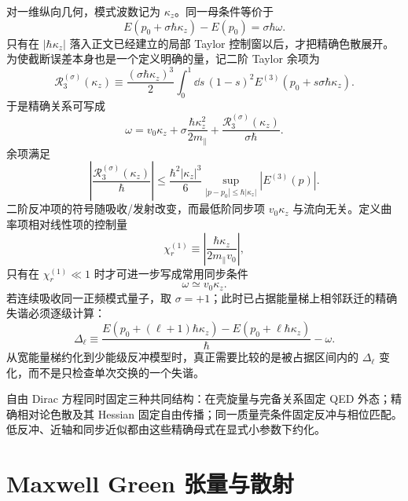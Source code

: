 对一维纵向几何，模式波数记为 $\kappa_z$。同一母条件等价于
\begin{equation}
 \boxed{E(p_0+\sigma\hbar \kappa_z)-E(p_0)=\sigma\hbar\omega.}
 \label{eq:exact-longitudinal-match}
\end{equation}
只有在 $|\hbar\kappa_z|$ 落入正文已经建立的局部 Taylor 控制窗以后，才把精确色散展开。为使截断误差本身也是一个定义明确的量，记二阶 Taylor 余项为
\begin{equation*}
 \mathcal R_3^{(\sigma)}(\kappa_z)
 \equiv
 \frac{(\sigma\hbar\kappa_z)^3}{2}
 \int_0^1\dd s\,(1-s)^2
 E^{(3)}\!\left(p_0+s\sigma\hbar\kappa_z\right).
\end{equation*}
于是精确关系可写成
\begin{equation}
 \boxed{
 \omega
 =v_0\kappa_z+\sigma\frac{\hbar \kappa_z^2}{2m_\parallel}
 +\frac{\mathcal R_3^{(\sigma)}(\kappa_z)}{\sigma\hbar}.}
 \label{eq:recoil-phase-match}
\end{equation}
余项满足
\begin{equation*}
 \left|
 \frac{\mathcal R_3^{(\sigma)}(\kappa_z)}{\hbar}
 \right|
 \le
 \frac{\hbar^2|\kappa_z|^3}{6}
 \sup_{|p-p_0|\le\hbar|\kappa_z|}|E^{(3)}(p)|.
\end{equation*}
二阶反冲项的符号随吸收/发射改变，而最低阶同步项 $v_0\kappa_z$ 与流向无关。定义曲率项相对线性项的控制量
\begin{equation*}
 \chi_r^{(1)}\equiv
 \left|\frac{\hbar \kappa_z}{2m_\parallel v_0}\right|,
\end{equation*}
只有在 $\chi_r^{(1)}\ll1$ 时才可进一步写成常用同步条件
\begin{equation}
 \omega\simeq v_0\kappa_z.
 \label{eq:linear-sync}
\end{equation}
若连续吸收同一正频模式量子，取 $\sigma=+1$；此时已占据能量梯上相邻跃迁的精确失谐必须逐级计算：
\begin{equation}
 \boxed{
 \Delta_\ell\equiv
 \frac{E(p_0+(\ell+1)\hbar \kappa_z)-E(p_0+\ell\hbar \kappa_z)}{\hbar}-\omega.}
 \label{eq:exact-ladder-detuning}
\end{equation}
从宽能量梯约化到少能级反冲模型时，真正需要比较的是被占据区间内的 $\Delta_\ell$ 变化，而不是只检查单次交换的一个失谐。

自由 Dirac 方程同时固定三种共同结构：在壳旋量与完备关系固定 QED 外态；精确相对论色散及其 Hessian 固定自由传播；同一质量壳条件固定反冲与相位匹配。低反冲、近轴和同步近似都由这些精确母式在显式小参数下约化。

\section{Maxwell Green 张量与散射}\label{sec:feqo-green}

